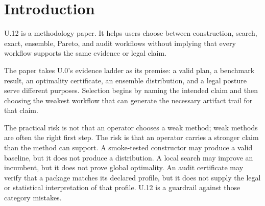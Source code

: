 \section{Introduction}

U.12 is a methodology paper. It helps users choose between construction,
search, exact, ensemble, Pareto, and audit workflows without implying that
every workflow supports the same evidence or legal claim.

The paper takes U.0's evidence ladder as its premise: a valid plan, a benchmark
result, an optimality certificate, an ensemble distribution, and a legal
posture serve different purposes. Selection begins by naming the intended claim
and then choosing the weakest workflow that can generate the necessary artifact
trail for that claim.

The practical risk is not that an operator chooses a weak method; weak methods
are often the right first step. The risk is that an operator carries a stronger
claim than the method can support. A smoke-tested constructor may produce a valid
baseline, but it does not produce a distribution. A local search may improve an
incumbent, but it does not prove global optimality. An audit certificate may
verify that a package matches its declared profile, but it does not supply the
legal or statistical interpretation of that profile. U.12 is a guardrail against
those category mistakes.

